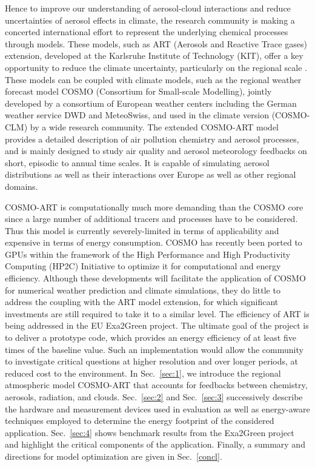 Hence to  improve our understanding of  aerosol-cloud interactions and
reduce  uncertainties  of aerosol  effects  in  climate, the  research
community is making a  concerted international effort to represent the
underlying chemical  processes through models.  These  models, such as
ART (Aerosols  and Reactive Trace  gases) extension, developed  at the
Karlsruhe Institute  of Technology (KIT),  offer a key  opportunity to
reduce   the  climate  uncertainty,   particularly  on   the  regional
scale \citep{Knote-2011, Bangert-2011,  Knote-2013}.  These models can
be coupled with climate models,  such as the regional weather forecast
model COSMO (Consortium  for Small-scale Modelling), jointly developed
by  a consortium  of  European weather  centers  including the  German
weather service  DWD and MeteoSwiss,  and used in the  climate version
(COSMO-CLM)  by a  wide  research community.   The extended  COSMO-ART
model provides  a detailed description of air  pollution chemistry and
aerosol processes,  and is  mainly designed to  study air  quality and
aerosol  meteorology  feedbacks  on  short, episodic  to  annual  time
scales.  It is capable of  simulating aerosol distributions as well as
their interactions over Europe as well as other regional domains.

COSMO-ART is  computationally much more demanding than  the COSMO core
since a  large number of additional  tracers and processes  have to be
considered.  Thus this model is currently severely-limited in terms of
applicability and expensive in terms of energy consumption.  COSMO has
recently  been  ported  to  GPUs  within the  framework  of  the  High
Performance  and  High  Productivity  Computing (HP2C)  Initiative  to
optimize it  for computational and energy  efficiency.  Although these
developments will  facilitate the  application of COSMO  for numerical
weather prediction and climate  simulations, they do little to address
the  coupling with  the  ART model  extension,  for which  significant
investments  are still required  to take  it to  a similar  level. The
efficiency of ART is being  addressed in the EU Exa2Green project. The
ultimate goal  of the  project is to  deliver a prototype  code, which
provides an energy  efficiency of at least five  times of the baseline
value.   Such   an  implementation   would  allow  the   community  to
investigate critical  questions at  higher resolution and  over longer
periods, at reduced cost  to the environment.  In Sec.~\ref{sec:1}, we
introduce the regional  atmospheric model COSMO-ART \citep{Vogel-2009}
that  accounts for feedbacks  between chemistry,  aerosols, radiation,
and   clouds.   Sec.~\ref{sec:2}  and   Sec.~\ref{sec:3}  successively
describe the  hardware and measurement  devices used in  evaluation as
well  as  energy-aware techniques  employed  to  determine the  energy
footprint  of  the  considered  application.   Sec.~\ref{sec:4}  shows
benchmark  results  from  the  Exa2Green  project  and  highlight  the
critical  components  of  the  application.  Finally,  a  summary  and
directions for model optimization are given in Sec.~\ref{concl}.

